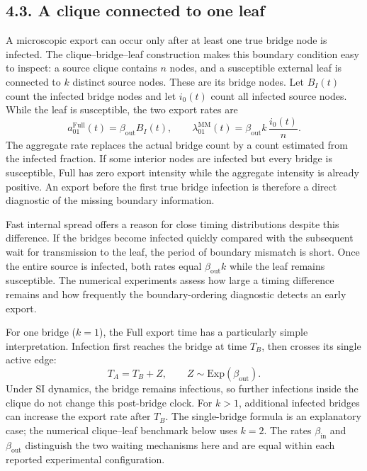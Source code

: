 \documentclass[10pt]{article}
\begin{document}
{\subsection*{4.3. A clique connected to one leaf}
A microscopic export can occur only after at least one true bridge node is infected. The clique--bridge--leaf construction makes this boundary condition easy to inspect: a source clique contains $n$ nodes, and a susceptible external leaf is connected to $k$ distinct source nodes. These are its bridge nodes. Let $B_I(t)$ count the infected bridge nodes and let $i_0(t)$ count all infected source nodes. While the leaf is susceptible, the two export rates are
\begin{equation*}
a^{\mathrm{Full}}_{01}(t)=\beta_{\mathrm{out}}B_I(t),\qquad
\lambda^{\mathrm{MM}}_{01}(t)=\beta_{\mathrm{out}}k\,\frac{i_0(t)}{n}.
\end{equation*}
The aggregate rate replaces the actual bridge count by a count estimated from the infected fraction. If some interior nodes are infected but every bridge is susceptible, Full has zero export intensity while the aggregate intensity is already positive. An export before the first true bridge infection is therefore a direct diagnostic of the missing boundary information.

Fast internal spread offers a reason for close timing distributions despite this difference. If the bridges become infected quickly compared with the subsequent wait for transmission to the leaf, the period of boundary mismatch is short. Once the entire source is infected, both rates equal $\beta_{\mathrm{out}}k$ while the leaf remains susceptible. The numerical experiments assess how large a timing difference remains and how frequently the boundary-ordering diagnostic detects an early export.

For one bridge ($k=1$), the Full export time has a particularly simple interpretation. Infection first reaches the bridge at time $T_B$, then crosses its single active edge:
\begin{equation*}
T_A=T_B+Z,\qquad Z\sim\mathrm{Exp}(\beta_{\mathrm{out}}).
\end{equation*}
Under SI dynamics, the bridge remains infectious, so further infections inside the clique do not change this post-bridge clock. For $k>1$, additional infected bridges can increase the export rate after $T_B$. The single-bridge formula is an explanatory case; the numerical clique--leaf benchmark below uses $k=2$. The rates $\beta_{\mathrm{in}}$ and $\beta_{\mathrm{out}}$ distinguish the two waiting mechanisms here and are equal within each reported experimental configuration.

}
\end{document}
